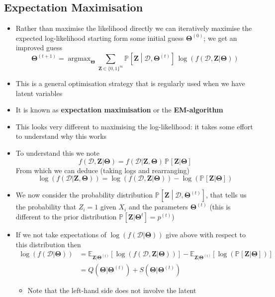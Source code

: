 \documentclass[11pt]{article}
\newcommand{\av}[2][]{\mathbb{E}_{#1\!}\left[ #2 \right]}
\newcommand{\Prob}[2][]{\mathbb{P}_{#1\!}\left[ #2 \right]}
\newcommand{\logg}[1]{\log\!\left( #1 \right)}
\newcommand{\argmax}{\mathop{\mathrm{argmax}}}
\begin{document}
\subsection{Expectation Maximisation}
\label{sec:org8fc05ac}
\begin{itemize}
\item Rather than maximise the likelihood directly we can iteratively
maximise the expected log-likelihood starting form some initial guess
\(\bm{\Theta}^{(0)}\); we get an improved guess
\begin{equation}
\bm{\Theta}^{(t+1)} = \argmax_{\bm{\Theta}}
\sum_{\bm{Z}\in\{0,1\}^m} \Prob{\bm{Z}\middle|\mathcal{D},\bm{\Theta}^{(t)}}\,
\logg{f(\mathcal{D},\bm{Z} | \bm{\Theta})} \label{eq:em}
\end{equation}
\item This is a general optimisation strategy that is regularly used
when we have latent variables
\item It is known as \textbf{expectation maximisation} or the \textbf{EM-algorithm}
\item This looks very different to maximising the log-likelihood: it
takes some effort to understand why this works
\item To understand this we note
$$f(\mathcal{D},\bm{Z}|\bm{\Theta}) =
      f(\mathcal{D}|\bm{Z},\bm{\Theta}) \, \Prob{\bm{Z}|\bm{\Theta}}  $$
From which we can deduce (taking logs and rearranging)
$$ \logg{f(\mathcal{D}|\bm{Z},\bm{\Theta})} = \logg{f(\mathcal{D},\bm{Z}|\bm{\Theta})} - \logg{\Prob{\bm{Z}|\bm{\Theta}} } $$
\item We now consider the probability distribution
\(\Prob{\bm{Z}\middle|\mathcal{D},\bm{\Theta}^{(t)}}\), that
tells us the probability that \(Z_i=1\) given \(X_i\) and the
parameters \(\bm{\Theta}^{(t)}\) (this is different to the prior
distribution \(\Prob{\bm{Z}|\bm{\Theta}^{t}} = p^{(t)}\))
\item If we not take expectations of
\(\logg{f(\mathcal{D}|\bm{\Theta})}\) give above with respect to
this distribution then
\begin{align*}
  \logg{f(\mathcal{D}|\bm{\Theta})}
   &= \av[\bm{Z}|\bm{\Theta}^{(t)}]{\logg{f(\mathcal{D},\bm{Z}|\bm{\Theta})}}
- \av[\bm{Z}|\bm{\Theta}^{(t)}]{\logg{\Prob{\bm{Z}|\bm{\Theta}} }}
  \\
  &= Q(\bm{\Theta}|\bm{\Theta}^{(t)}) +
  S(\bm{\Theta}|\bm{\Theta}^{(t)})
\end{align*}
\begin{itemize}
\item Note that the left-hand side does not involve the latent

\end{itemize}
\end{itemize}
\end{document}

